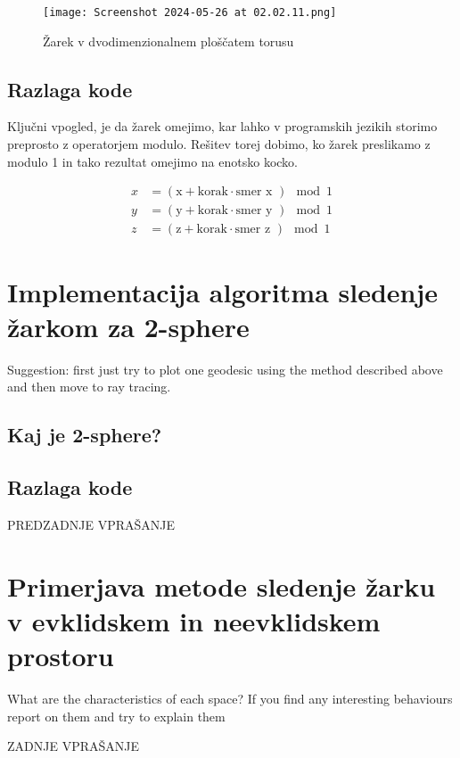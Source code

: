 \documentclass[titlepage]{article}
\begin{document}
\begin{figure}[H]
    \centering
    \texttt{[image: Screenshot 2024-05-26 at 02.02.11.png]}
    \caption{Žarek v dvodimenzionalnem ploščatem torusu}
    \label{fig:enter-label}
\end{figure}



\subsection{Razlaga kode}

Ključni vpogled, je da žarek omejimo, kar lahko v programskih jezikih storimo preprosto z operatorjem modulo. Rešitev torej dobimo, ko žarek preslikamo z modulo 1 in tako rezultat omejimo na enotsko kocko.
        
\begin{align*}
x &= \left( \text{x} + \text{korak} \cdot \text{smer x }\right) \mod 1 \\
y &= \left( \text{y} + \text{korak} \cdot \text{smer y }\right) \mod 1 \\
z &= \left( \text{z} + \text{korak} \cdot \text{smer z }\right) \mod 1
\end{align*}

\section{Implementacija algoritma sledenje žarkom za 2-sphere}
Suggestion: first just try to plot one geodesic
using the method described above and then move to ray tracing.

\subsection{Kaj je 2-sphere?}

\subsection{Razlaga kode}
PREDZADNJE VPRAŠANJE 

\section {Primerjava metode sledenje žarku v evklidskem in neevklidskem prostoru}
What are the characteristics of each space? If you find any
interesting behaviours report on them and try to explain them

ZADNJE VPRAŠANJE 
\end{document}
